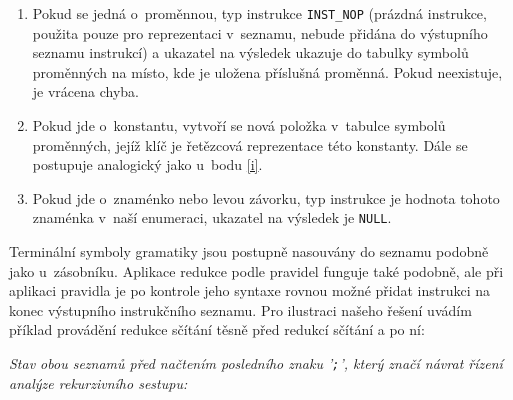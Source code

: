 \documentclass[12pt,a4paper,titlepage,final]{article}
\begin{document}
    \begin{enumerate}
      \item \label{i} Pokud se jedná o~proměnnou, typ instrukce
      \texttt{INST\_NOP} (prázdná instrukce, použita pouze pro reprezentaci
      v~seznamu, nebude přidána do výstupního seznamu instrukcí) a ukazatel na
      výsledek ukazuje do tabulky symbolů proměnných na místo, kde je uložena
      příslušná proměnná. Pokud neexistuje, je vrácena chyba.

      \item Pokud jde o~konstantu, vytvoří se nová položka v~tabulce symbolů
      proměnných, jejíž klíč je řetězcová reprezentace této konstanty. Dále se
      postupuje analogický jako u~bodu \ref{i}.

      \item Pokud jde o~znaménko nebo levou závorku, typ instrukce je hodnota
      tohoto znaménka v~naší enumeraci, ukazatel na výsledek je \texttt{NULL}.
    \end{enumerate}

    Terminální symboly gramatiky jsou postupně nasouvány do seznamu podobně
    jako u~zásobníku. Aplikace redukce podle pravidel funguje také podobně,
    ale při aplikaci pravidla je po kontrole jeho syntaxe rovnou možné přidat
    instrukci na konec výstupního instrukčního seznamu. Pro ilustraci našeho
    řešení uvádím příklad provádění redukce sčítání těsně před redukcí sčítání
    a po ní:

    \noindent
    \textit{Stav obou seznamů před načtením posledního znaku '\texttt{;}',
    který značí návrat řízení analýze rekurzivního sestupu:}
\end{document}
